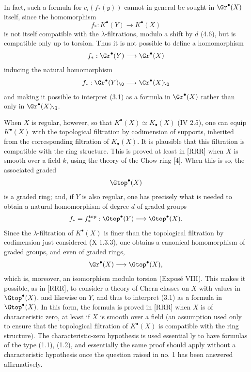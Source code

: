 In fact, such a formula for $c_i(f_*(y))$ cannot in general be sought in $\Gr^\bullet(X)$ itself, since the homomorphism
\[
  f_*:K^\bullet(Y)\longrightarrow K^\bullet(X)
\]
is not itself compatible with the $\lambda$-filtrations, modulo a shift by $d$ (4.6), but is compatible only up to torsion. Thus it is not possible to define a homomorphism
\[
  f_*:\Gr^\bullet(Y)\longrightarrow\Gr^\bullet(X)
\]
inducing the natural homomorphism
\[
  f_*:\Gr^\bullet(Y)_{\Q}\longrightarrow\Gr^\bullet(X)_{\Q}
\]
and making it possible to interpret (3.1) as a formula in $\Gr^\bullet(X)$ rather than only in $\Gr^\bullet(X)_{\Q}$.

When $X$ is regular, however, so that $K^\bullet(X)\simeq K_\bullet(X)$ (IV 2.5), one can equip $K^\bullet(X)$ with the topological filtration by codimension of supports, inherited from the corresponding filtration of $K_\bullet(X)$. It is plausible that this filtration is compatible with the ring structure. This is proved at least in [RRR] when $X$ is smooth over a field $k$, using the theory of the Chow ring [4]. When this is so, the associated graded
\[
  \Gtop^\bullet(X)
\]
is a graded ring; and, if $Y$ is also regular, one has precisely what is needed to obtain a natural homomorphism of degree $d$ of graded groups
\[
  f_*=f_*^{\mathrm{top}}:\Gtop^\bullet(Y)
  \longrightarrow\Gtop^\bullet(X).
\]
Since the $\lambda$-filtration of $K^\bullet(X)$ is finer than the topological filtration by codimension just considered (X 1.3.3), one obtains a canonical homomorphism of graded groups, and even of graded rings,
\[
  \Gr^\bullet(X)\longrightarrow\Gtop^\bullet(X),
\]
which is, moreover, an isomorphism modulo torsion (Expos\'e VIII). This makes it possible, as in [RRR], to consider a theory of Chern classes on $X$ with values in $\Gtop^\bullet(X)$, and likewise on $Y$, and thus to interpret (3.1) as a formula in $\Gtop^\bullet(X)$. In this form, the formula is proved in [RRR] when $X$ is of characteristic zero, at least if $X$ is smooth over a field (an assumption used only to ensure that the topological filtration of $K^\bullet(X)$ is compatible with the ring structure). The characteristic-zero hypothesis is used essential%
ly to have formulas of the type (1.1), (1.2), and essentially the same proof should apply without a characteristic hypothesis once the question raised in no. 1 has been answered affirmatively.


